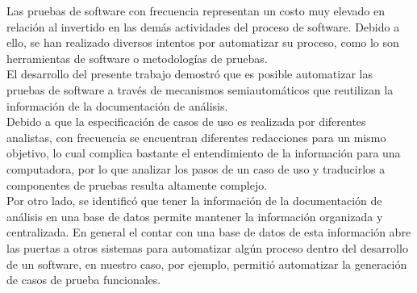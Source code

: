 	Las pruebas de software con frecuencia representan un costo muy elevado en relación al invertido en las demás actividades del proceso de software. Debido a ello, se han realizado diversos intentos por automatizar su proceso, como lo son herramientas de software o metodologías de pruebas.\\

	El desarrollo del presente trabajo demostró que es posible automatizar las pruebas de software a través de mecanismos semiautomáticos que reutilizan la información de la documentación de análisis.\\
	
	Debido a que la especificación de casos de uso es realizada por diferentes analistas, con frecuencia se encuentran diferentes redacciones para un mismo objetivo, lo cual complica bastante el entendimiento de la información para una computadora, por lo que analizar los pasos de un caso de uso y traducirlos a componentes de pruebas resulta altamente complejo.\\
		
	Por otro lado, se identificó que tener la información de la documentación de análisis en una base de datos permite mantener la información organizada y centralizada. En general el contar con una base de datos de esta información abre las puertas a otros sistemas para automatizar algún proceso dentro del desarrollo de un software, en nuestro caso, por ejemplo, permitió automatizar la generación de casos de prueba funcionales.